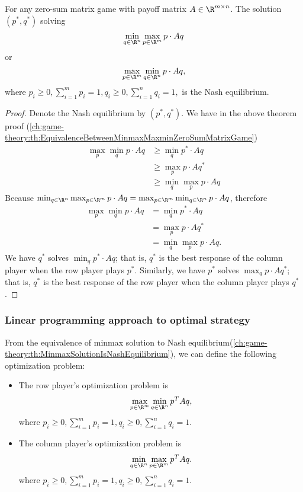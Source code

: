 \begin{refsection}
\begin{theorem}\label{ch:game-theory:th:MinmaxSolutionIsNashEquilibrium}
	For any zero-sum matrix game with payoff matrix $A\in \R^{m\times n}$. The solution $(p^*,q^*)$ solving  
	$$\min_{q\in \R^n} \max_{p\in \R^m} p\cdot Aq$$ or $$  \max_{p\in \R^m}  \min_{q\in \R^n} p\cdot Aq, $$
			where $p_i \geq 0, \sum_{i=1}^m p_i = 1,q_i \geq 0, \sum_{i=1}^n q_i = 1,$
	is the Nash equilibrium.	
\end{theorem}
\begin{proof}
Denote the Nash equilibrium by $(p^*,q^*)$. We have in the above theorem proof (\autoref{ch:game-theory:th:EquivalenceBetweenMinmaxMaxminZeroSumMatrixGame})
\begin{align*}
\max_p\min_q p\cdot A q &\geq \min_q p^* \cdot A q \\
&\geq \max_p p \cdot A q^* \\
&\geq \min_q\max_p p \cdot A q
\end{align*}
Because $\min_{q\in \R^n} \max_{p\in \R^m} p\cdot Aq =  \max_{p\in \R^m}  \min_{q\in \R^n} p\cdot Aq $, therefore
\begin{align*}
\max_p\min_q p\cdot A q &= \min_q p^* \cdot A q \\
&= \max_p p \cdot A q^* \\
&= \min_q\max_p p \cdot A q.
\end{align*}
We have $q^*$ solves $\min_q p^* \cdot A q$; that is, $q^*$ is the best response of the column player when the row player plays $p^*$. Similarly, we have $p^*$ solves $\max_q p \cdot A q^*$; that is, $q^*$ is the best response of the row player when the column player plays $q^*$.
\end{proof}



\subsubsection{Linear programming approach to optimal strategy}

\begin{definition} From the equivalence of minmax solution to Nash equilibrium(\autoref{ch:game-theory:th:MinmaxSolutionIsNashEquilibrium}), we can define the following optimization problem:
	\begin{itemize}
		\item The row player's optimization problem is
		$$ \max_{p\in \R^m} \min_{q\in \R^n} p^TAq,$$
		where $p_i \geq 0, \sum_{i=1}^m p_i = 1,q_i \geq 0, \sum_{i=1}^n q_i = 1.$
		\item The column player's optimization problem is
		$$ \min_{q\in \R^n} \max_{p\in \R^m} p^TAq.$$
		where $p_i \geq 0, \sum_{i=1}^m p_i = 1,q_i \geq 0, \sum_{i=1}^n q_i = 1.$
	\end{itemize}	
\end{definition}



\end{refsection}
